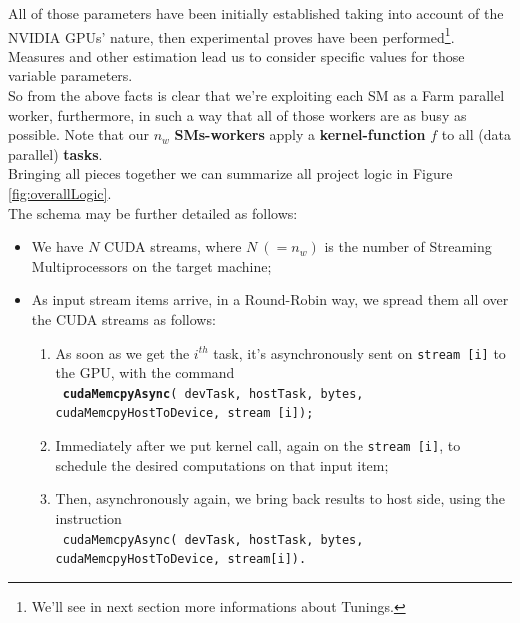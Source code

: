 	All of those parameters have been initially established taking into account of the NVIDIA GPUs' nature, then experimental proves have been performed\footnote{We'll see in next section more informations about Tunings.}. Measures and other estimation lead us to consider specific values for those variable parameters.\\
	So from the above facts is clear that we're exploiting each SM as a Farm parallel worker, furthermore, in such a way that all of those workers are as busy as possible. Note that our \(n_w\) \textbf{SMs-workers} apply a \textbf{kernel-function} \(f\) to all (data parallel) \textbf{tasks}.\\
	Bringing all pieces together we can summarize all project logic in Figure \ref{fig:overallLogic}.\\
	The schema may be further detailed as follows:
					
	\begin{itemize}
		\item We have \(N\) CUDA streams, where \(N\  (=n_w)\) is the number of Streaming Multiprocessors on the target machine;
		\item As input stream items arrive, in a Round-Robin way, we spread them all over the CUDA streams as follows:
		\begin{enumerate}
			\item As soon as we get the \(i^{th}\) task, it's asynchronously sent on \texttt{stream [i]} to the GPU, with the command \\ 
			\texttt{ \textbf{cudaMemcpyAsync}( devTask, hostTask, bytes, cudaMemcpyHostToDevice, \tab \tab \tab \tab stream [i]);}
			
			\item Immediately after we put kernel call, again on the \texttt{stream [i]}, to schedule the desired computations on that input item;
			
			\item Then, asynchronously again, we bring back results to host side, using the instruction \\
			\texttt{ cudaMemcpyAsync( devTask, hostTask, bytes, cudaMemcpyHostToDevice, \tab \tab \tab \tab stream[i]).}
			
		\end{enumerate}
	\end{itemize}


